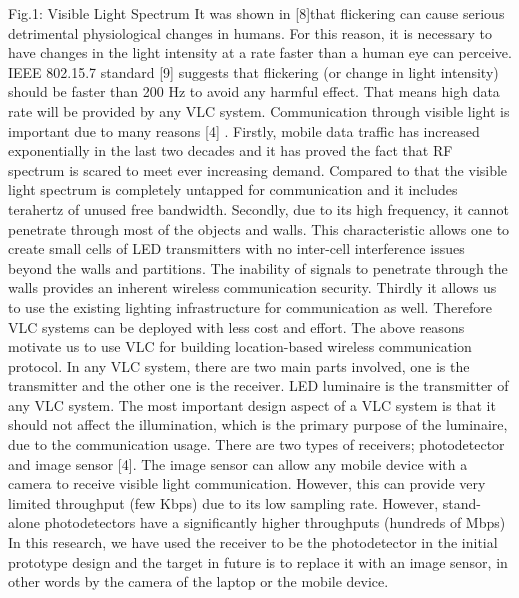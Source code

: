 Fig.1: Visible Light Spectrum
It was shown in [8]that flickering can cause serious detrimental physiological changes in humans. For this reason, it is necessary to have changes in the light intensity at a rate faster than a human eye can perceive. IEEE 802.15.7 standard [9] suggests that flickering (or change in light intensity) should be faster than 200 Hz to avoid any harmful effect. That means high data rate will be provided by any VLC system. 
Communication through visible light is important due to many reasons [4] . Firstly, mobile data traffic has increased exponentially in the last two decades and it has proved the fact that RF spectrum is scared to meet ever increasing demand. Compared to that the visible light spectrum is completely untapped for communication and it includes terahertz of unused free bandwidth. Secondly, due to its high frequency, it cannot penetrate through most of the objects and walls. This characteristic allows one to create small cells of LED transmitters with no inter-cell interference issues beyond the walls and partitions. The inability of signals to penetrate through the walls provides an inherent wireless communication security. Thirdly it allows us to use the existing lighting infrastructure for communication as well. Therefore VLC systems can be deployed with less cost and effort. The above reasons motivate us to use VLC for building location-based wireless communication protocol.
In any VLC system, there are two main parts involved, one is the transmitter and the other one is the receiver. LED luminaire is the transmitter of any VLC system. The most important design aspect of a VLC system is that it should not affect the illumination, which is the primary purpose of the luminaire, due to the communication usage. There are two types of receivers; photodetector and image sensor [4]. The image sensor can allow any mobile device with a camera to receive visible light communication. However, this can provide very limited throughput (few Kbps) 
due to its low sampling rate. However, stand-alone photodetectors have a significantly higher throughputs (hundreds of Mbps) In this research, we have used the receiver to be the photodetector in the initial prototype design and the target in future is to replace it with an image sensor, in other words by the camera of the laptop or the mobile device.

